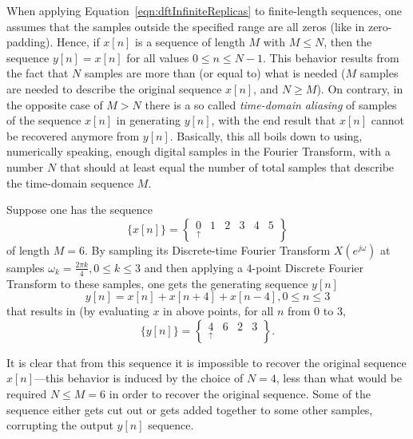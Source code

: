 \documentclass[\documentfontsize, twocolumn]{\classname}
\begin{document}
When applying Equation~\ref{eqn:dftInfiniteReplicas} to finite-length sequences, one assumes that the samples outside the specified range are all zeros (like in zero-padding). Hence, if $x[n]$ is a sequence of length $M$ with $M \leq N$, then the sequence $y[n] = x[n]$ for all values $0 \leq n \leq N-1$. This behavior results from the fact that $N$ samples are more than (or equal to) what is needed ($M$ samples are needed to describe the original sequence $x[n]$, and $N \geq M$). On contrary, in the opposite case of $M > N$ there is a so called \emph{time-domain aliasing} of samples of the sequence $x[n]$ in generating $y[n]$, with the end result that $x[n]$ cannot be recovered anymore from $y[n]$. Basically, this all boils down to using, numerically speaking, enough digital samples in the Fourier Transform, with a number $N$ that should at least equal the number of total samples that describe the time-domain sequence $M$.

Suppose one has the sequence
\[\{x[n]\} = \begin{Bmatrix} \underset{\uparrow}{0} & 1 & 2 & 3 & 4 & 5\end{Bmatrix}\]
of length $M=6$. By sampling its Discrete-time Fourier Transform $X(e^{j\omega})$ at samples $\omega_k = \frac{2\pi k}{4}, 0 \leq k \leq 3$ and then applying a $4$-point Discrete Fourier Transform to these samples, one gets the generating sequence $y[n]$
\[
    y[n] = x[n] + x[n+4] + x[n-4], 0 \leq n \leq 3
\]
that results in (by evaluating $x$ in above points, for all $n$ from $0$ to $3$,
\[
    \{y[n]\} = \begin{Bmatrix}\underset{\uparrow}{4} & 6 & 2 & 3\end{Bmatrix}.
\]

It is clear that from this sequence it is impossible to recover the original sequence $x[n]$---this behavior is induced by the choice of $N=4$, less than what would be required $N\leq M = 6$ in order to recover the original sequence. Some of the sequence either gets cut out or gets added together to some other samples, corrupting the output $y[n]$ sequence.
\end{document}
